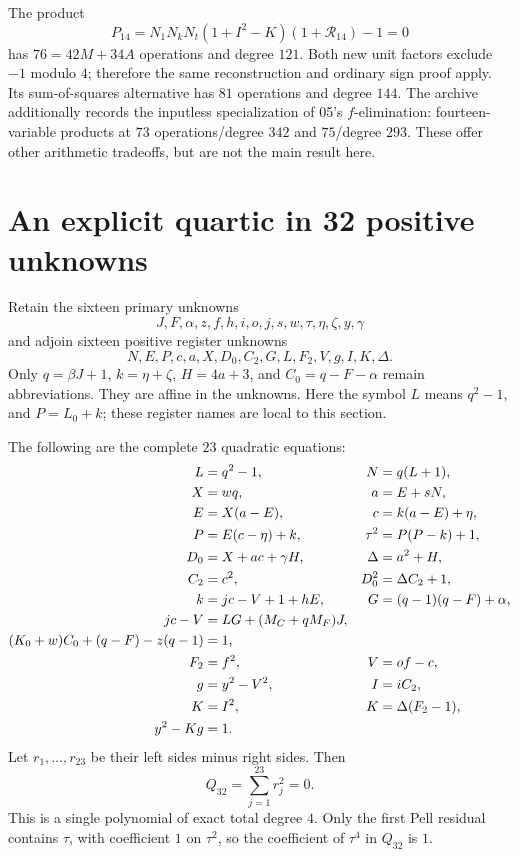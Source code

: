 \documentclass[11pt,a4paper]{article}
\theoremstyle{remark}\newtheorem{remark}[theorem]{Remark}
\begin{document}
The product
\[
 \boxed{\quad P_{14}=N_1N_kN_t(1+I^2-K)(1+\mathcal R_{14})-1=0\quad}
\]
has $76=42M+34A$ operations and degree $121$.
Both new unit factors exclude $-1$ modulo $4$; therefore the same
reconstruction and ordinary sign proof apply. Its sum-of-squares
alternative has $81$ operations and degree $144$.
The archive additionally records the inputless specialization of 05's
$f$-elimination: fourteen-variable products at $73$ operations/degree
$342$ and $75$/degree $293$. These offer other arithmetic tradeoffs,
but are not the main result here.

\section{An explicit quartic in 32 positive unknowns}
\label{sec:quartic}

Retain the sixteen primary unknowns
\[
 J,F,\alpha,z,f,h,i,o,j,s,w,\tau,\eta,\zeta,y,\gamma
\]
and adjoin sixteen positive register unknowns
\[
 N,E,P,c,a,X,D_0,C_2,G,L,F_2,V,g,I,K,\Delta.
\]
Only $q=\beta J+1$, $k=\eta+\zeta$, $H=4a+3$, and
$C_0=q-F-\alpha$ remain abbreviations. They are affine in the
unknowns. Here the symbol $L$ means $q^2-1$, and $P=L_0+k$;
these register names are local to this section.

The following are the complete $23$ quadratic equations:
\begin{align}
 L&=q^2-1,&N&=q(L+1),\notag\\
 X&=wq,&a&=E+sN,\notag\\
 E&=X(a-E),&c&=k(a-E)+\eta,\notag\\
 P&=E(c-\eta)+k,&\tau^2&=P(P-k)+1,\notag\\
 D_0&=X+ac+\gamma H,&\Delta&=a^2+H,\notag\\
 C_2&=c^2,&D_0^2&=\Delta C_2+1,\notag\\
 k&=jc-V+1+hE,&G&=(q-1)(q-F)+\alpha,\notag\\
 jc-V&=LG+(M_C+qM_F)J,&&\notag\\
 (K_0+w)C_0+(q-F)-z(q-1)&=1,&&\notag\\
 F_2&=f^2,&V&=of-c,\notag\\
 g&=y^2-V^2,&I&=iC_2,\notag\\
 K&=I^2,&K&=\Delta(F_2-1),\notag\\
 y^2-Kg&=1.&&\label{eq:quad23}
\end{align}
Let $r_1,\ldots,r_{23}$ be their left sides minus right sides. Then
\begin{equation}
 \boxed{\qquad Q_{32}=\sum_{j=1}^{23}r_j^2=0.\qquad}
 \label{eq:quartic32}
\end{equation}
This is a single polynomial of exact total degree $4$. Only the first
Pell residual contains $\tau$, with coefficient $1$ on $\tau^2$,
so the coefficient of $\tau^4$ in $Q_{32}$ is $1$.
\end{document}
